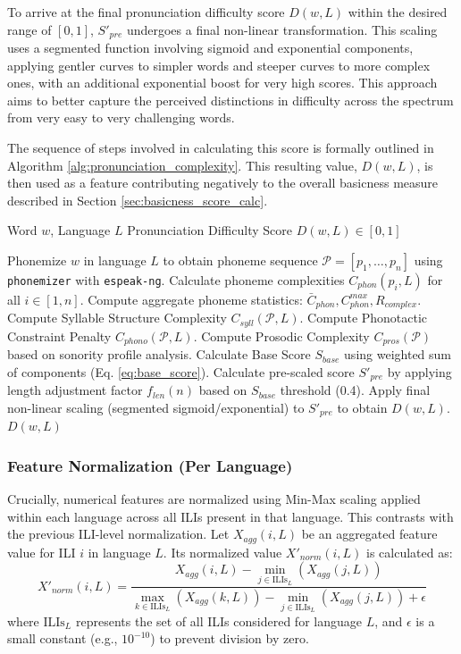 \documentclass[preprint,12pt,authoryear]{elsarticle}
\begin{document}
To arrive at the final pronunciation difficulty score $D(w, L)$ within the desired range of $[0, 1]$, $S'_{pre}$ undergoes a final non-linear transformation. This scaling uses a segmented function involving sigmoid and exponential components, applying gentler curves to simpler words and steeper curves to more complex ones, with an additional exponential boost for very high scores. This approach aims to better capture the perceived distinctions in difficulty across the spectrum from very easy to very challenging words.

The sequence of steps involved in calculating this score is formally outlined in Algorithm \ref{alg:pronunciation_complexity}. This resulting value, $D(w, L)$, is then used as a feature contributing negatively to the overall basicness measure described in Section \ref{sec:basicness_score_calc}.

\begin{algorithm}[ht]
\caption{Pronunciation complexity calculation}
\label{alg:pronunciation_complexity}
\begin{algorithmic}[1]
\Require Word \( w \), Language \( L \)
\Ensure Pronunciation Difficulty Score \( D(w, L) \in [0, 1] \)

\State Phonemize \( w \) in language \( L \) to obtain phoneme sequence \( \mathcal{P} = [p_1, \dots, p_n] \) using \texttt{phonemizer} with \texttt{espeak-ng}.
\State Calculate phoneme complexities \( C_{phon}(p_i, L) \) for all \( i \in [1, n] \).
\State Compute aggregate phoneme statistics: \( \bar{C}_{phon}, C_{phon}^{max}, R_{complex} \).
\State Compute Syllable Structure Complexity \( C_{syll}(\mathcal{P}, L) \).
\State Compute Phonotactic Constraint Penalty \( C_{phono}(\mathcal{P}, L) \).
\State Compute Prosodic Complexity \( C_{pros}(\mathcal{P}) \) based on sonority profile analysis.
\State Calculate Base Score \( S_{base} \) using weighted sum of components (Eq. \ref{eq:base_score}).
\State Calculate pre-scaled score \( S'_{pre} \) by applying length adjustment factor \( f_{len}(n) \) based on \( S_{base} \) threshold (0.4).
\State Apply final non-linear scaling (segmented sigmoid/exponential) to \( S'_{pre} \) to obtain \( D(w, L) \).
\State \Return \( D(w, L) \)
\end{algorithmic}
\end{algorithm}

\subsubsection{Feature Normalization (Per Language)}
Crucially, numerical features are normalized using Min-Max scaling applied within each language across all ILIs present in that language. This contrasts with the previous ILI-level normalization. Let $X_{agg}(i, L)$ be an aggregated feature value for ILI $i$ in language $L$. Its normalized value $X'_{norm}(i, L)$ is calculated as:
\[
X'_{norm}(i, L) = \frac{X_{agg}(i, L) - \min_{j \in \text{ILIs}_L}(X_{agg}(j, L))}{\max_{k \in \text{ILIs}_L}(X_{agg}(k, L)) - \min_{j \in \text{ILIs}_L}(X_{agg}(j, L)) + \epsilon}
\]
where $\text{ILIs}_L$ represents the set of all ILIs considered for language $L$, and $\epsilon$ is a small constant (e.g., $10^{-10}$) to prevent division by zero.
\end{document}
